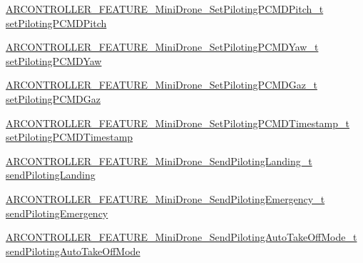 \begin{DoxyCompactItemize}
\item 
\hyperlink{_a_r_c_o_n_t_r_o_l_l_e_r___feature_8h_abe414f8b3089cc0725135c8693dfa906}{A\+R\+C\+O\+N\+T\+R\+O\+L\+L\+E\+R\+\_\+\+F\+E\+A\+T\+U\+R\+E\+\_\+\+Mini\+Drone\+\_\+\+Set\+Piloting\+P\+C\+M\+D\+Pitch\+\_\+t} \hyperlink{struct_a_r_c_o_n_t_r_o_l_l_e_r___f_e_a_t_u_r_e___mini_drone__t_a1743c755a56c4a662799e97b45c7fdba}{set\+Piloting\+P\+C\+M\+D\+Pitch}
\item 
\hyperlink{_a_r_c_o_n_t_r_o_l_l_e_r___feature_8h_ad16a010d1b4a2d989f1ec1df5ea96092}{A\+R\+C\+O\+N\+T\+R\+O\+L\+L\+E\+R\+\_\+\+F\+E\+A\+T\+U\+R\+E\+\_\+\+Mini\+Drone\+\_\+\+Set\+Piloting\+P\+C\+M\+D\+Yaw\+\_\+t} \hyperlink{struct_a_r_c_o_n_t_r_o_l_l_e_r___f_e_a_t_u_r_e___mini_drone__t_a5fd51ddfa8b632777354c598d01e7bc0}{set\+Piloting\+P\+C\+M\+D\+Yaw}
\item 
\hyperlink{_a_r_c_o_n_t_r_o_l_l_e_r___feature_8h_af2eb6cd7763efde449281af310970100}{A\+R\+C\+O\+N\+T\+R\+O\+L\+L\+E\+R\+\_\+\+F\+E\+A\+T\+U\+R\+E\+\_\+\+Mini\+Drone\+\_\+\+Set\+Piloting\+P\+C\+M\+D\+Gaz\+\_\+t} \hyperlink{struct_a_r_c_o_n_t_r_o_l_l_e_r___f_e_a_t_u_r_e___mini_drone__t_ae6bcce1335f8a56e9d4e153045d1dfcf}{set\+Piloting\+P\+C\+M\+D\+Gaz}
\item 
\hyperlink{_a_r_c_o_n_t_r_o_l_l_e_r___feature_8h_a5fea991b669680d294096075e0239de8}{A\+R\+C\+O\+N\+T\+R\+O\+L\+L\+E\+R\+\_\+\+F\+E\+A\+T\+U\+R\+E\+\_\+\+Mini\+Drone\+\_\+\+Set\+Piloting\+P\+C\+M\+D\+Timestamp\+\_\+t} \hyperlink{struct_a_r_c_o_n_t_r_o_l_l_e_r___f_e_a_t_u_r_e___mini_drone__t_a42cc438275afc5f699722e0172af758c}{set\+Piloting\+P\+C\+M\+D\+Timestamp}
\item 
\hyperlink{_a_r_c_o_n_t_r_o_l_l_e_r___feature_8h_a02bc16ebd44df08881bc9847f531806f}{A\+R\+C\+O\+N\+T\+R\+O\+L\+L\+E\+R\+\_\+\+F\+E\+A\+T\+U\+R\+E\+\_\+\+Mini\+Drone\+\_\+\+Send\+Piloting\+Landing\+\_\+t} \hyperlink{struct_a_r_c_o_n_t_r_o_l_l_e_r___f_e_a_t_u_r_e___mini_drone__t_a91bf3ab7631a0e150352ceeb1636e216}{send\+Piloting\+Landing}
\item 
\hyperlink{_a_r_c_o_n_t_r_o_l_l_e_r___feature_8h_af050f3ed23f12f92f06b39cbe14d742f}{A\+R\+C\+O\+N\+T\+R\+O\+L\+L\+E\+R\+\_\+\+F\+E\+A\+T\+U\+R\+E\+\_\+\+Mini\+Drone\+\_\+\+Send\+Piloting\+Emergency\+\_\+t} \hyperlink{struct_a_r_c_o_n_t_r_o_l_l_e_r___f_e_a_t_u_r_e___mini_drone__t_a47538f4fb0399106a1f5b9ccb3eb5a6b}{send\+Piloting\+Emergency}
\item 
\hyperlink{_a_r_c_o_n_t_r_o_l_l_e_r___feature_8h_ac63a1fa68c503689eba1af3f993149f0}{A\+R\+C\+O\+N\+T\+R\+O\+L\+L\+E\+R\+\_\+\+F\+E\+A\+T\+U\+R\+E\+\_\+\+Mini\+Drone\+\_\+\+Send\+Piloting\+Auto\+Take\+Off\+Mode\+\_\+t} \hyperlink{struct_a_r_c_o_n_t_r_o_l_l_e_r___f_e_a_t_u_r_e___mini_drone__t_a6861ae9fe62f9cb0fb12e160d35e019d}{send\+Piloting\+Auto\+Take\+Off\+Mode}

\end{DoxyCompactItemize}
